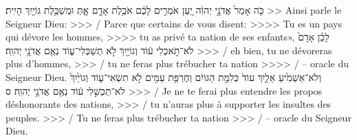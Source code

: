 \begin{paracol}[1]
  \verset
  {כֹּ֤ה אָמַר֙ אֲדֹנָ֣י יְהוִ֔ה
    יַ֚עַן אֹמְרִ֣ים לָכֶ֔ם
    אֹכֶ֥לֶת אָדָ֖ם אָ֑תְּ
    וּמְשַׁכֶּ֥לֶת גּוֹיַ֖יִךְ הָיִֽית׃}
  {>> Ainsi parle le Seigneur Dieu:
    >>> / Parce que certains de vous disent:
    >>>> Tu es un pays qui dévore les hommes,
    >>>> tu as privé ta nation de ses enfants»,}
  \verset
  {לָכֵ֗ן אָדָם֙ לֹא־תֹ֣אכְלִי ע֔וֹד
    וְגוֹיַ֖יִךְ לֹ֣א תְשַׁכְּלִי־ע֑וֹד
    נְאֻ֖ם אֲדֹנָ֥י יְהוִֽה׃}
  {>>> / eh bien, tu ne dévoreras plus d’hommes,
    >>> / tu ne feras plus trébucher ta nation
    >>>> / – oracle du Seigneur Dieu.}
  \verset
  {וְלֹא־אַשְׁמִ֙יעַ אֵלַ֤יִךְ עוֹד֙ כְּלִמַּ֣ת הַגּוֹיִ֔ם
    וְחֶרְפַּ֥ת עַמִּ֖ים לֹ֣א תִשְׂאִי־ע֑וֹד
    וְגוֹיַ֙יִךְ֙ לֹא־תַכְשִׁ֣לִי ע֔וֹד
    נְאֻ֖ם אֲדֹנָ֥י יְהוִֽה׃ ס}
  {>>> / Je ne te ferai plus entendre les propos déshonorants des nations,
    >>> / tu n’auras plus à supporter les insultes des peuples.
    >>> / Tu ne feras plus trébucher ta nation
    >>> / – oracle du Seigneur Dieu.}
  \parSpace

\end{paracol}
